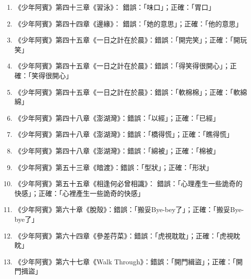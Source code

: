 \begin{enumerate}
\item 《少年阿賓》第四十三章《習泳》： 錯誤：「味口」；正確：「胃口」
\item 《少年阿賓》第四十四章《邊緣》： 錯誤：「她的意思」；正確：「他的意思」
\item 《少年阿賓》第四十五章《一日之計在於晨》：錯誤：「開完笑」；正確：「開玩笑」
\item 《少年阿賓》第四十五章《一日之計在於晨》：錯誤：「得笑得很開心」；正確：「笑得很開心」
\item 《少年阿賓》第四十五章《一日之計在於晨》：錯誤：「軟棉棉」；正確：「軟綿綿」
\item《少年阿賓》第四十八章《澎湖灣》：錯誤：「以經」；正確：「已經」
\item《少年阿賓》第四十八章《澎湖灣》：錯誤：「橋得慌」；正確：「瞧得慌」
\item《少年阿賓》第四十八章《澎湖灣》：錯誤：「綿被」；正確：「棉被」
\item《少年阿賓》第五十三章《暗渡》：錯誤：「型狀」；正確：「形狀」
\item 《少年阿賓》第五十五章《相逢何必曾相識》： 錯誤：「心理產生一些詭奇的快感」；正確：「心裡產生一些詭奇的快感」
\item 《少年阿賓》第六十章《脫殼》：錯誤：「搬妥Bye-bey了」；正確：「搬妥Bye-bye了」
\item 《少年阿賓》第六十四章《參差荇菜》：錯誤：「虎視耽耽」；正確：「虎視眈眈」
\item 《少年阿賓》第六十七章《Walk Through》：錯誤：「開門緝盜」；正確：「開門揖盜」
\end{enumerate}
